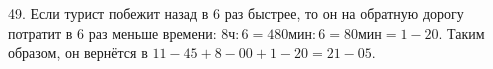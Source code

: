 49. Если турист побежит назад в 6 раз быстрее, то он на обратную дорогу потратит в 6 раз меньше времени: $8\text{ч}:6=480\text{мин}:6=80\text{мин}=1-20.$ Таким образом, он вернётся в $11-45+8-00+1-20=21-05.$\\
